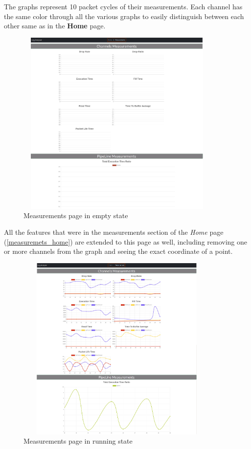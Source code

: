 The graphs represent 10 packet cycles of their measurements. Each channel has the same color through all the
various graphs to easily distinguish between each other same as in the \textbf{Home} page.
\newline
\begin{figure}[H]
	\centering
	\includegraphics[width=0.9\textwidth,height=350px]{images/measures_empty.jpg}
	\caption{Measurements page in empty state}
	\label{fig:measures_empty}
\end{figure}

All the features that were in the measurements section of the \textit{Home} page (\ref{measuremets_home})
are extended to this page as well, including removing one or more channels from the graph and
seeing the exact coordinate of a point.
\begin{figure}[H]
	\centering
	\includegraphics[width=0.9\textwidth,height=350px]{images/measures_running_state.jpg}
	\caption{Measurements page in running state}
	\label{fig:measures_running_state}
\end{figure}